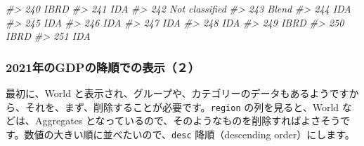\documentclass[
  xelatex, ja=standard]{bxjsbook}
\newenvironment{Shaded}{\begin{snugshade}}{\end{snugshade}}
\newcommand{\CommentTok}[1]{\textcolor[rgb]{0.56,0.35,0.01}{\textit{#1}}}
\theoremstyle{definition}
\theoremstyle{definition}
\theoremstyle{definition}
\theoremstyle{definition}
\theoremstyle{remark}
\begin{document}
\begin{Shaded}
\begin{Highlighting}[]
\CommentTok{\#\textgreater{} 240           IBRD}
\CommentTok{\#\textgreater{} 241            IDA}
\CommentTok{\#\textgreater{} 242 Not classified}
\CommentTok{\#\textgreater{} 243          Blend}
\CommentTok{\#\textgreater{} 244            IDA}
\CommentTok{\#\textgreater{} 245            IDA}
\CommentTok{\#\textgreater{} 246            IDA}
\CommentTok{\#\textgreater{} 247            IDA}
\CommentTok{\#\textgreater{} 248            IDA}
\CommentTok{\#\textgreater{} 249           IBRD}
\CommentTok{\#\textgreater{} 250           IBRD}
\CommentTok{\#\textgreater{} 251            IDA}
\end{Highlighting}
\end{Shaded}

\hypertarget{ux5e74ux306egdpux306eux964dux9806ux3067ux306eux8868ux793auxff12}{%
\subsubsection{2021年のGDPの降順での表示（２）}\label{ux5e74ux306egdpux306eux964dux9806ux3067ux306eux8868ux793auxff12}}

最初に、World と表示され、グループや、カテゴリーのデータもあるようですから、それを、まず、削除することが必要です。\texttt{region} の列を見ると、World などは、Aggregates となっているので、そのようなものを削除すればよさそうです。数値の大きい順に並べたいので、\texttt{desc} 降順（descending order）にします。
\end{document}
